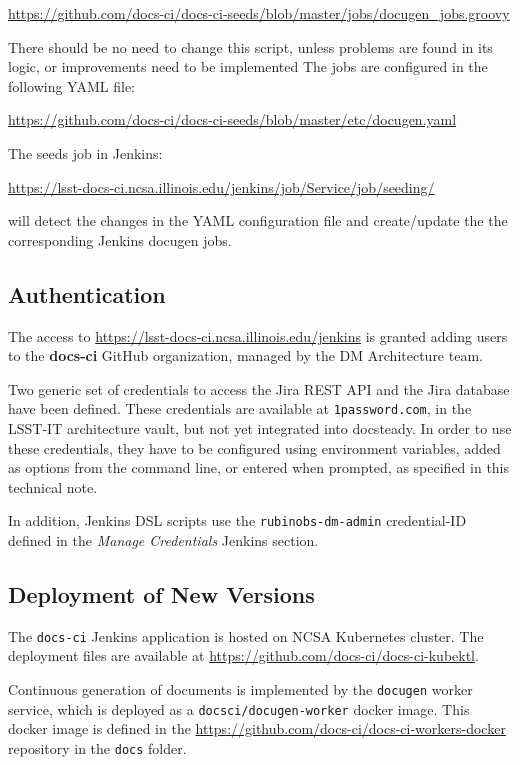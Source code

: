 \url{https://github.com/docs-ci/docs-ci-seeds/blob/master/jobs/docugen_jobs.groovy}

There should be no need to change this script, unless problems are found in its logic, or improvements need to be implemented
The jobs are configured in the following YAML file:

\url{https://github.com/docs-ci/docs-ci-seeds/blob/master/etc/docugen.yaml}

The seeds job in Jenkins:

\url{https://lsst-docs-ci.ncsa.illinois.edu/jenkins/job/Service/job/seeding/}

will detect the changes in the YAML configuration file and create/update the the corresponding Jenkins docugen jobs.



\subsection{Authentication}\label{sec:auth}

The access to \url{https://lsst-docs-ci.ncsa.illinois.edu/jenkins} is granted adding users to the \textbf{docs-ci} GitHub organization, 
managed by the DM Architecture team.

Two generic set of credentials to access the Jira REST API and the Jira database have been defined.
These credentials are available at \texttt{1password.com}, in the LSST-IT architecture vault, but not yet integrated into docsteady.
In order to use these credentials, they have to be configured using environment variables, added as options from the command line, or entered when prompted, as specified in this technical note.

In addition, Jenkins DSL scripts use the \texttt{rubinobs-dm-admin} credential-ID defined in the \textit{Manage Credentials} Jenkins section.


\subsection{Deployment of New Versions}\label{sec:deploy}

The \texttt{docs-ci} Jenkins application is hosted on NCSA Kubernetes cluster. The deployment files are available at
\url{https://github.com/docs-ci/docs-ci-kubektl}.

Continuous generation of documents is implemented by the \texttt{docugen} worker service, which is deployed as a \texttt{docsci/docugen-worker} docker image.
This docker image is defined in the \url{https://github.com/docs-ci/docs-ci-workers-docker} repository in the \texttt{docs} folder.

